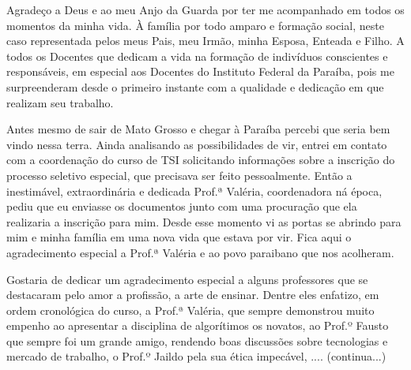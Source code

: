 
\begin{agradecimentos}[AGRADECIMENTOS]

    Agradeço a Deus e ao meu Anjo da Guarda  por ter me acompanhado em todos os momentos da minha vida. 
    À família por todo amparo e formação social, neste caso representada pelos meus Pais, meu Irmão, minha Esposa, Enteada e Filho. 
    A todos os Docentes que dedicam a vida na formação de indivíduos conscientes e responsáveis, em especial aos Docentes do Instituto Federal da Paraíba, pois me surpreenderam desde o primeiro instante com a qualidade e dedicação em que realizam seu trabalho.

    Antes mesmo de sair de Mato Grosso e chegar à Paraíba percebi que seria bem vindo nessa terra. Ainda analisando as possibilidades de vir, entrei em contato com a coordenação do curso de TSI solicitando informações sobre a inscrição do processo seletivo especial, que precisava ser feito pessoalmente. Então a inestimável, extraordinária e dedicada Prof.ª Valéria, coordenadora ná época, pediu que eu enviasse os documentos junto com uma procuração que ela realizaria a inscrição para mim. Desde esse momento vi as portas se abrindo para mim e minha família em uma nova vida que estava por vir. Fica aqui o agradecimento especial a Prof.ª Valéria e ao povo paraibano que nos acolheram.

    Gostaria de dedicar um agradecimento especial a alguns professores que se destacaram pelo amor a profissão, a arte de ensinar. Dentre eles enfatizo, em ordem cronológica do curso, a Prof.ª Valéria, que sempre demonstrou muito empenho ao apresentar a disciplina de algorítimos os novatos, ao Prof.º Fausto que sempre foi um grande amigo, rendendo boas discussões sobre tecnologias e mercado de trabalho, o Prof.º Jaildo pela sua ética impecável, .... (continua...)

\end{agradecimentos}
